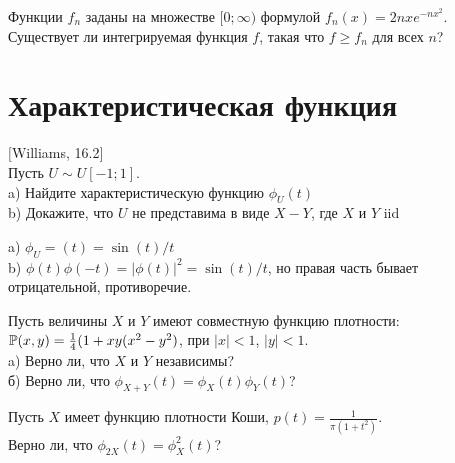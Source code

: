 \begin{problem}
Функции $f_n$ заданы на множестве $[0;\infty)$ формулой $f_n(x)=2nxe^{-nx^2}$. Существует ли  интегрируемая функция $f$, такая что $f\geq f_n$ для всех $n$?

\begin{sol}
\end{sol}
\end{problem}


\section{Характеристическая функция}

\begin{problem}
$[$Williams, 16.2$]$ \\
Пусть $U\sim U[-1;1]$. \\
a) Найдите характеристическую функцию $\phi_{U}(t)$ \\
b) Докажите, что $U$ не представима в виде $X-Y$, где $X$ и $Y$
iid

\begin{sol}


a) $\phi_{U}=(t)=\sin(t)/t$ \\
b) $\phi(t)\phi(-t)=|\phi(t)|^{2}=\sin(t)/t$, но правая часть
бывает отрицательной, противоречие.
\end{sol}
\end{problem}

\begin{problem}
Пусть величины $X$ и $Y$ имеют совместную функцию плотности: \\
$\P(x,y)=\frac{1}{4}(1+xy(x^{2}-y^{2})$, при $|x|<1$, $|y|<1$. \\
a) Верно ли, что $X$ и $Y$ независимы? \\
б) Верно ли, что $\phi_{X+Y}(t)=\phi_{X}(t)\phi_{Y}(t)$?

\begin{sol}

\end{sol}
\end{problem}

\begin{problem}
Пусть $X$ имеет функцию плотности Коши,
$p(t)=\frac{1}{\pi(1+t^{2})}$. \\
Верно ли, что $\phi_{2X}(t)=\phi_{X}^{2}(t)$?

\begin{sol}

\end{sol}
\end{problem}

